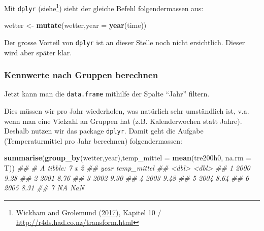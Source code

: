\documentclass[]{book}
\newenvironment{Shaded}{\begin{snugshade}}{\end{snugshade}}
\newcommand{\CommentTok}[1]{\textcolor[rgb]{0.56,0.35,0.01}{\textit{#1}}}
\newcommand{\DataTypeTok}[1]{\textcolor[rgb]{0.13,0.29,0.53}{#1}}
\newcommand{\DecValTok}[1]{\textcolor[rgb]{0.00,0.00,0.81}{#1}}
\newcommand{\KeywordTok}[1]{\textcolor[rgb]{0.13,0.29,0.53}{\textbf{#1}}}
\newcommand{\NormalTok}[1]{#1}
\newcommand{\OperatorTok}[1]{\textcolor[rgb]{0.81,0.36,0.00}{\textbf{#1}}}
\newcommand{\StringTok}[1]{\textcolor[rgb]{0.31,0.60,0.02}{#1}}
\let\rmarkdownfootnote\footnote%
\def\footnote{\protect\rmarkdownfootnote}
\begin{document}
Mit \texttt{dplyr} (siehe\footnote{Wickham and Grolemund (\protect\hyperlink{ref-wickham2017}{2017}), Kapitel 10 / \url{http://r4ds.had.co.nz/transform.html}}) sieht der gleiche Befehl folgendermassen aus:

\begin{Shaded}
\begin{Highlighting}[]
\NormalTok{wetter <-}\StringTok{ }\KeywordTok{mutate}\NormalTok{(wetter,}\DataTypeTok{year =} \KeywordTok{year}\NormalTok{(time))}
\end{Highlighting}
\end{Shaded}

Der grosse Vorteil von \texttt{dplyr} ist an dieser Stelle noch nicht ersichtlich. Dieser wird aber später klar.

\hypertarget{kennwerte-nach-gruppen-berechnen}{%
\subsubsection{Kennwerte nach Gruppen berechnen}\label{kennwerte-nach-gruppen-berechnen}}

Jetzt kann man die \texttt{data.frame} mithilfe der Spalte ``Jahr'' filtern.

\begin{Shaded}
\end{Shaded}

Dies müssen wir pro Jahr wiederholen, was natürlich sehr umständlich ist, v.a. wenn man eine Vielzahl an Gruppen hat (z.B. Kalenderwochen statt Jahre). Deshalb nutzen wir das package \texttt{dplyr}. Damit geht die Aufgabe (Temperaturmittel pro Jahr berechnen) folgendermassen:

\begin{Shaded}
\begin{Highlighting}[]
\KeywordTok{summarise}\NormalTok{(}\KeywordTok{group_by}\NormalTok{(wetter,year),}\DataTypeTok{temp_mittel =} \KeywordTok{mean}\NormalTok{(tre200h0, }\DataTypeTok{na.rm =}\NormalTok{ T))}
\CommentTok{## # A tibble: 7 x 2}
\CommentTok{##    year temp_mittel}
\CommentTok{##   <dbl>       <dbl>}
\CommentTok{## 1  2000        9.28}
\CommentTok{## 2  2001        8.76}
\CommentTok{## 3  2002        9.30}
\CommentTok{## 4  2003        9.48}
\CommentTok{## 5  2004        8.64}
\CommentTok{## 6  2005        8.31}
\CommentTok{## 7    NA      NaN}
\end{Highlighting}
\end{Shaded}
\end{document}

